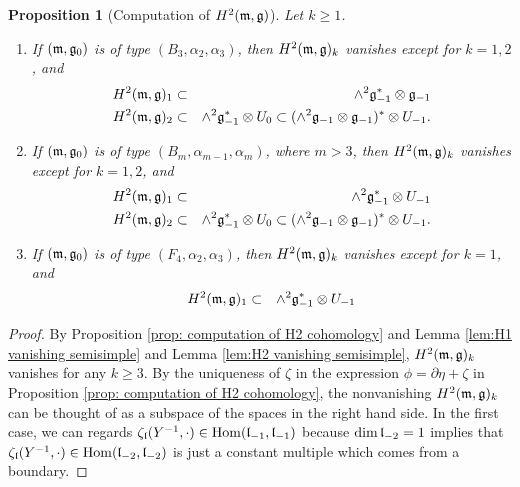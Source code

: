 \documentclass[12pt]{amsart}
\theoremstyle{plain}
\newtheorem{proposition}[theorem]{Proposition}
\theoremstyle{definition}
\def\Hom{\operatorname{Hom}}
\begin{document}
\begin{proposition} [Computation of $H^2(\frak m, \frak g)$]  \label{prop:H2 vanishing}
 Let $k \geq 1$.  %
\begin{enumerate}
\item If $(\frak m,\frak g_0)$ is of type $(B_3, \alpha_{2}, \alpha_3 )$,  then $H^{ 2}(\frak m, \frak g)_k$ vanishes except for $k=1,2$, and
    \begin{eqnarray*}
    H^2(\frak m, \frak g)_1 &\subset& \wedge^2 \frak g_{-1}^* \otimes \frak g_{-1} \\
    H^2(\frak m, \frak g)_2 &\subset& \wedge^2 \frak g_{-1}^* \otimes U_0  \subset (\wedge ^2 \frak g_{-1}  \otimes \mathfrak g_{-1})^* \otimes U_{-1}.
    \end{eqnarray*}
\item If $(\frak m,\frak g_0)$ is of type $(B_m, \alpha_{m-1}, \alpha_m )$, where $m >3$,  then $H^{ 2}(\frak m, \frak g)_k$ vanishes except for $k=1,2$, and
    \begin{eqnarray*}
    H^2(\frak m, \frak g)_1 &\subset& \wedge^2 \frak g_{-1}^* \otimes U_{-1} \\
    H^2(\frak m, \frak g)_2 &\subset& \wedge^2 \frak g_{-1}^* \otimes U_0  \subset (\wedge ^2 \frak g_{-1}  \otimes \mathfrak g_{-1})^* \otimes U_{-1}.
    \end{eqnarray*}
\item If $(\frak m,\frak g_0)$ is of type $(F_4, \alpha_2, \alpha_3 )$, then $H^{ 2}(\frak m, \frak g)_k$ vanishes except for $k=1 $, and
    \begin{eqnarray*}
    H^2(\frak m, \frak g)_1 &\subset& \wedge^2 \frak g_{-1}^* \otimes U_{-1}%
    \end{eqnarray*}
\end{enumerate}

\end{proposition}

\begin{proof}
By Proposition \ref{prop: computation of H2 cohomology} and Lemma \ref{lem:H1 vanishing semisimple} and Lemma \ref{lem:H2 vanishing semisimple}, $H^{ 2}(\frak m, \frak g)_k$ vanishes for any $ k \geq 3$. By the uniqueness of $\zeta$ in the expression $\phi = \partial \eta + \zeta$ in Proposition \ref{prop: computation of H2 cohomology}, the nonvanishing $H^2(\frak m, \frak g)_k$ can be thought of as a subspace of the spaces in the right hand side.  In the first case, we can regards $\zeta_{\frak l}({Y^{-1}}, \cdot ) \in \Hom(\frak l_{-1},\frak l_{-1})$ because $\dim \frak l_{-2} =1$ implies that $\zeta_{\frak l}({Y^{-1}}, \cdot )\in \Hom(\frak l_{-2},\frak l_{-2})$ is just a constant multiple which comes from a boundary.
\end{proof}
\end{document}
